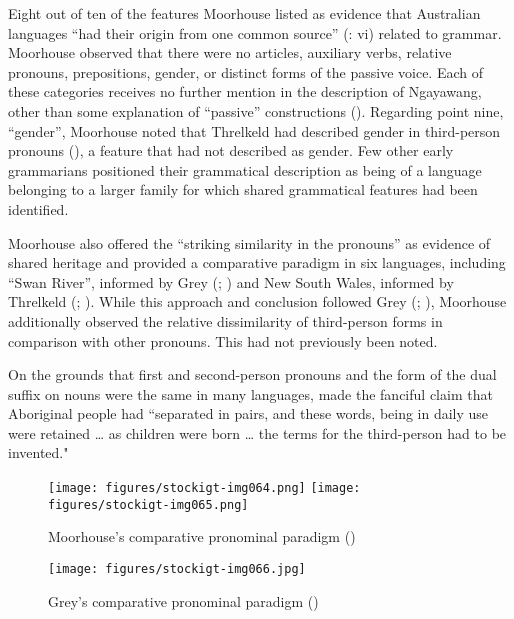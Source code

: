 Eight out of ten of the features Moorhouse listed as evidence that Australian languages “had their origin from one common source” (\citeyear{moorhouse_vocabulary_1846}: vi) related to grammar. Moorhouse observed that there were no articles, auxiliary verbs, relative pronouns, prepositions, gender, or distinct forms of the passive voice. Each of these categories receives no further mention in the description of Ngayawang, other than some explanation of “passive” constructions (). Regarding point nine, “gender”, Moorhouse noted that Threlkeld had described gender in third-person pronouns (), a feature that \citet[3]{schurmann_aboriginal_1846} had not described as gender. Few other early grammarians positioned their grammatical description as being of a language belonging to a larger family for which shared grammatical features had been identified.

Moorhouse also offered the “striking similarity in the pronouns” \citep[vi]{schurmann_aboriginal_1846} as evidence of shared heritage and provided a comparative paradigm in six languages, including ``Swan River'', informed by Grey (\citeyear{grey_vocabulary_1839}; \citeyear{grey_journals_1841}) and New South Wales, informed by Threlkeld (\citeyear{threlkeld_australian_1834}; ). While this approach and conclusion followed Grey (\citeyear{grey_journals_1841}; ), Moorhouse additionally observed the relative dissimilarity of third-person forms in comparison with other pronouns. This had not previously been noted.

On the grounds that first and second-person pronouns and the form of the dual suffix on nouns were the same in many languages, \citet[vii]{moorhouse_vocabulary_1846} made the fanciful claim that Aboriginal people had “separated in pairs, and these words, being in daily use were retained … as children were born … the terms for the third-person had to be invented."


\begin{figure}
\texttt{[image: figures/stockigt-img064.png]}
\texttt{[image: figures/stockigt-img065.png]}
\caption{Moorhouse’s comparative pronominal paradigm (\citeyear[vi--vii]{moorhouse_vocabulary_1846})}
\label{fig:key:119}
\end{figure}

\begin{figure}
\texttt{[image: figures/stockigt-img066.jpg]}
\caption{Grey’s comparative pronominal paradigm (\citeyear{Grey1840})}
\label{fig:key:120}
\end{figure}

